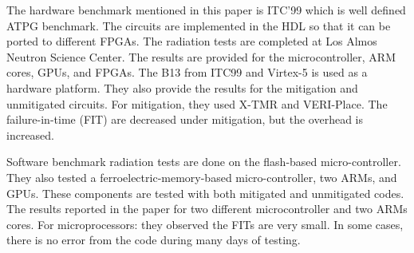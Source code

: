 The hardware benchmark mentioned in this paper is ITC'99 which is well defined ATPG benchmark. The circuits are implemented in the HDL so that it can be ported to different FPGAs.  The radiation tests are completed at Los Almos Neutron Science
Center. The results are provided for the microcontroller, ARM cores, GPUs, and
FPGAs. The B13 from ITC99 and Virtex-5 is used
as a hardware platform. They also provide the results for the mitigation and unmitigated circuits. For mitigation, they
used X-TMR and VERI-Place. The failure-in-time (FIT) are decreased under mitigation,
but the overhead is increased.

Software benchmark radiation tests are done on the flash-based micro-controller. They also tested a ferroelectric-memory-based micro-controller, two ARMs, and GPUs. These components are tested with both mitigated and unmitigated codes. The results reported in the paper for two different microcontroller and two ARMs cores. For microprocessors: they observed the FITs are very small. In some cases, there is no error from the code during many days of testing. 










